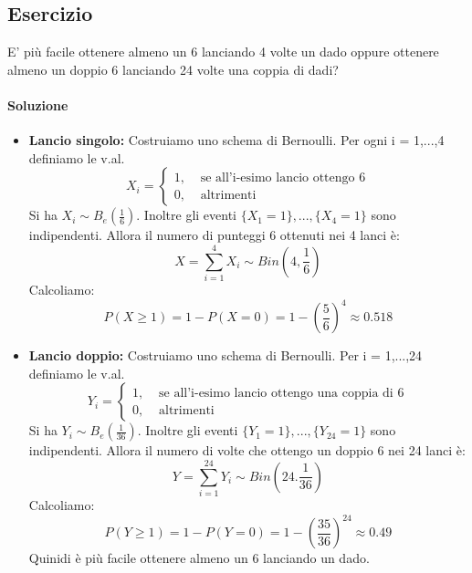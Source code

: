 \documentclass{report}
\begin{document}
\subsection{Esercizio}
E' più facile ottenere almeno un 6 lanciando 4 volte un dado oppure ottenere almeno un doppio 6 lanciando 24 volte una coppia di dadi?
\paragraph{Soluzione}
\begin{itemize}
    \item \textbf{Lancio singolo:} Costruiamo uno schema di Bernoulli. Per ogni i = 1,...,4 definiamo le v.al.
    \[X_i = 
    \begin{cases}
    1, & \text{ se all'i-esimo lancio ottengo 6}\\
    0, & \text{ altrimenti}
    \end{cases}\]
    Si ha \(X_i \sim B_e (\frac{1}{6})\). Inoltre gli eventi \(\{X_1 = 1\},...,\{X_4 = 1\}\) sono indipendenti. Allora il numero di punteggi 6 ottenuti nei 4 lanci è:
    \[X = \sum_{i = 1}^{4} X_i \sim Bin(4, \frac{1}{6})\]
    Calcoliamo:
    \[P(X \geq 1) = 1 - P(X = 0) = 1 - (\frac{5}{6})^4 \approx 0.518\]
    \item \textbf{Lancio doppio:} Costruiamo uno schema di Bernoulli. Per i = 1,...,24 definiamo le v.al.
    \[Y_i = \begin{cases}
    1, & \text{ se all'i-esimo lancio ottengo una coppia di 6}\\
    0, & \text{ altrimenti}
    \end{cases}\]
    Si ha \(Y_i \sim B_e (\frac{1}{36})\). Inoltre gli eventi \(\{Y_1 = 1\},..., \{Y_{24} = 1\}\) sono indipendenti. Allora il numero di volte che ottengo un doppio 6 nei 24 lanci è:
    \[Y = \sum_{i = 1}^{24} Y_i \sim Bin(24. \frac{1}{36})\]
    Calcoliamo:
    \[P(Y \geq 1) = 1 - P(Y = 0) = 1 - (\frac{35}{36})^{24} \approx 0.49\]
    Quinidi è più facile ottenere almeno un 6 lanciando un dado.
\end{itemize}
\end{document}
